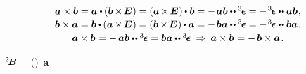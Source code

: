 \begin{otherlanguage}{russian}
\nopagebreak\begin{equation}\label{crossproductoftwovectors}
\begin{array}{c}
\bm{a} \times \bm{b}
= \bm{a} \dotp \hspace{-0.1ex} \left( \bm{b} \hspace{-0.1ex} \times \hspace{-0.25ex} \bm{E} \hspace{.1ex} \right)
= \left( \bm{a} \hspace{-0.1ex} \times \hspace{-0.25ex} \bm{E} \hspace{.1ex} \right) \hspace{-0.1ex} \dotp \bm{b}
= - \hspace{.25ex} \bm{a} \bm{b} \dotdotp \levicivitatensor
= - \hspace{.2ex} \levicivitatensor \dotdotp \bm{a} \bm{b}
\hspace{.15ex} ,
\\[.15em]
%
\bm{b} \times \bm{a}
= \bm{b} \dotp \hspace{-0.1ex} \left( \bm{a} \hspace{-0.1ex} \times \hspace{-0.25ex} \bm{E} \hspace{.1ex} \right)
= \left( \bm{b} \hspace{-0.1ex} \times \hspace{-0.25ex} \bm{E} \hspace{.1ex} \right)  \hspace{-0.1ex} \dotp \bm{a}
= - \hspace{.25ex} \bm{b} \bm{a} \dotdotp \levicivitatensor
= - \hspace{.2ex} \levicivitatensor \dotdotp \bm{b} \bm{a}
\hspace{.15ex} ,
\\[.2em]
%
\bm{a} \times \bm{b} \hspace{.16ex}
= - \hspace{.33ex} \bm{a} \bm{b} \dotdotp \levicivitatensor
= \bm{b} \bm{a} \dotdotp \levicivitatensor
\:\Rightarrow\:
\bm{a} \times \bm{b} \hspace{.16ex} = - \hspace{.32ex} \bm{b} \times \bm{a}
\hspace{.2ex} .
\end{array}
\end{equation}

\vspace{-0.2em} \noindent
{}  ~${\hspace{-0.2ex}^2\hspace{-0.16em}\bm{B}}$
~~()~$\bm{a}$


\end{otherlanguage}

